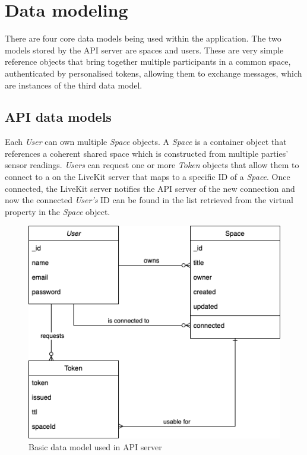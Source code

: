 \section{Data modeling}
\label{section:dataModeling}

There are four core data models being used within the application. The two models stored by the \ac{API} server are spaces and users. These are very simple reference objects that bring together multiple participants in a common space, authenticated by personalised tokens, allowing them to exchange messages, which are instances of the third data model.

\subsection{API data models}

Each \emph{User} can own multiple \emph{Space} objects. A \emph{Space} is a container object that references a coherent shared space which is constructed from multiple parties' sensor readings. \emph{Users} can request one or more \emph{Token} objects that allow them to connect to a  on the LiveKit server that maps to a specific ID of a \emph{Space}. Once connected, the LiveKit server notifies the \ac{API} server of the new connection and now the connected \emph{User's} ID can be found in the list retrieved from the virtual  property in the \emph{Space} object.

\begin{figure}[h]
\centering
\includegraphics[scale=0.4]{04_Artefakte/01_Abbildungen/api-datamodel}
\caption[API data model]{Basic data model used in API server\protect}
\label{fig:apiDataModel}
\end{figure}


